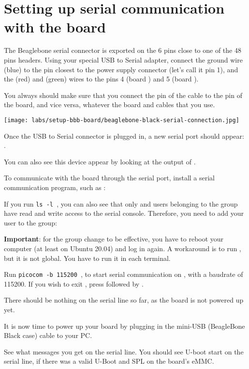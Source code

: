 
\section{Setting up serial communication with the board}

The Beaglebone serial connector is exported on the 6 pins close to one
of the 48 pins headers. Using your special USB to Serial adapter, connect
the ground wire (blue) to the pin closest to the power supply connector
(let's call it pin 1), and the  (red) and  (green) wires
to the pins 4 (board ) and 5 (board ).

You always should make sure that you connect the  pin of the cable
to the  pin of the board, and vice versa, whatever the board and
cables that you use.

\begin{center}
\texttt{[image: labs/setup-bbb-board/beaglebone-black-serial-connection.jpg]}
\end{center}

Once the USB to Serial connector is plugged in, a new serial port
should appear: .

You can also see this device appear by looking at the output of
.

To communicate with the board through the serial port, install a
serial communication program, such as :


If you run {\tt ls -l \hosttty}, you can also see that only
 and users belonging to the  group have
read and write access to the serial console. Therefore, you need
to add your user to the  group:


{\bf Important}: for the group change to be effective, you have to
reboot your computer (at least on Ubuntu 20.04) and log in again.
A workaround is to run , but it is not global.
You have to run it in each terminal.

Run {\tt picocom -b 115200 \hosttty}, to start serial
communication on {\tt \hosttty}, with a baudrate of 115200.
If you wish to exit , press \code{[Ctrl][a]} followed by
\code{[Ctrl][x]}.

There should be nothing on the serial line so far, as the board is not
powered up yet.

It is now time to power up your board by plugging in the mini-USB
(BeagleBone Black case) cable to your PC.

See what messages you get on the serial line. You should see U-boot
start on the serial line, if there was a valid U-Boot and SPL on the board's eMMC.

